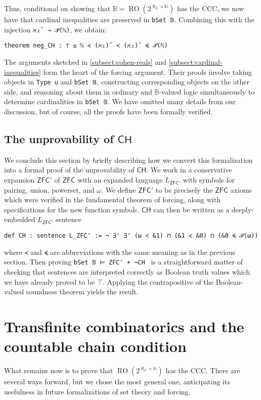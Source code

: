 \documentclass[a4paper,USenglish,cleveref, autoref]{lipics-v2019}
\newcommand{\B}{\mathbb{B}}
\newcommand{\lil}{\lstinline}
\theoremstyle{definition}
\begin{document}
Thus, conditional on showing that $\B = \operatorname{RO}(2^{\aleph_2 \times \mathbb{N}})$ has the CCC, we now have that cardinal inequalities are preserved in \lstinline{bSet 𝔹}. Combining this with the injection \lil{ℵ₂̌  → 𝒫(ℕ)}, we obtain:
\begin{lstlisting}
theorem neg_CH : ⊤ ≤ ℕ ≺ (ℵ₁)̌  ≺ (ℵ₂)̌  ≼ 𝒫(ℕ)
\end{lstlisting}

The arguments sketched in \autoref{subsect:cohen-reals} and \autoref{subsect:cardinal-inequalities} form the heart of the forcing argument. Their proofs involve taking objects in \lil{Type u} and \lil{bSet 𝔹}, constructing corresponding objects on the other side, and reasoning about them in ordinary and $\B$-valued logic simultaneously to determine cardinalities in \lstinline{bSet 𝔹}. We have omitted many details from our discussion, but of course, all the proofs have been formally verified.

\subsection{The unprovability of $\mathsf{CH}$}
We conclude this section by briefly describing how we convert this formalization into a formal proof of the unprovability of $\mathsf{CH}$. We work in a conservative expansion $\mathsf{ZFC}'$ of $\mathsf{ZFC}$ with an expanded language $L_{\mathsf{ZFC}'}$ with symbols for pairing, union, powerset, and $\omega$. We define $\mathsf{ZFC}'$ to be precisely the $\mathsf{ZFC}$ axioms which were verified in the fundamental theorem of forcing, along with specifications for the new function symbols. $\mathsf{CH}$ can then be written as a deeply-embedded $L_{\mathsf{ZFC}'}$ sentence
\begin{lstlisting}
def CH : sentence L_ZFC' := ¬ ∃' ∃' (ω ≺ &1) ⊓ (&1 ≺ &0) ⊓ (&0 ≼ 𝒫(ω))
\end{lstlisting}
where \lil{≺} and \lil{≼} are abbreviations with the same meaning as in the previous section. Then proving \lstinline{bSet 𝔹 ⊨ ZFC' + ¬CH } is a straightforward matter of checking that sentences are interpreted correctly as Boolean truth values which we have already proved to be $\top$. Applying the contrapositive of the Boolean-valued soundness theorem yields the result.

\section{Transfinite combinatorics and the countable chain condition}
\label{sect:ccc}
What remains now is to prove that $\operatorname{RO}(2^{\aleph_2 \times \mathbb{N}})$ has the CCC. There are several ways forward, but we chose the most general one, anticipating its usefulness in future formalizations of set theory and forcing.
\end{document}
